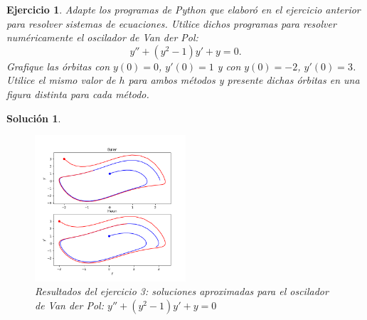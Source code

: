 \documentclass[11pt]{article}
\newtheorem{exercise}{Ejercicio}
\newtheorem*{sol}{Solución}
\begin{document}
\begin{exercise}
  Adapte los programas de Python que elaboró en el ejercicio anterior
  para resolver sistemas de ecuaciones. Utilice dichos programas para
  resolver numéricamente el oscilador de Van der Pol:
  \begin{equation}
    y'' + (y^{2}-1)y' + y = 0
  .\end{equation}
  Grafique las órbitas con $y(0)=0$, $y'(0)=1$ y con $y(0)=-2$,
  $y'(0)=3$. Utilice el mismo valor de $h$ para ambos métodos y
  presente dichas órbitas en una figura distinta para cada método.
\end{exercise}
\begin{sol}
  \leavevmode
  \begin{figure}[hb]
    \centering
    \includegraphics[width=0.5\textwidth]{img/jaac_tarea1_ejercicio3}
    \caption{Resultados del ejercicio 3: soluciones aproximadas para
      el oscilador de Van der Pol: $y'' + (y^{2}-1)y' + y = 0$}
    \label{fig:exe_2}
  \end{figure}
\end{sol}
\end{document}
